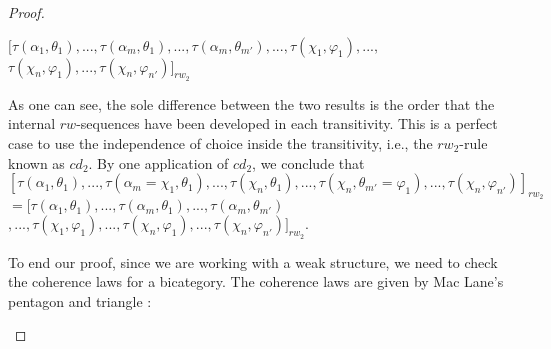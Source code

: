 \documentclass[12pt, a4paper,  oneside, headinclude,footinclude, BCOR5mm]{scrartcl}
\begin{document}
\begin{proof}
\begin{center}
$[\tau(\alpha_{1},\theta_{1}),...,\tau(\alpha_{m},\theta_{1}),...,\tau(\alpha_{m},\theta_{m'}),...,\tau(\chi_{1}, \varphi_{1}),...,$ $\tau(\chi_{n},\varphi_{1}),...,\tau(\chi_{n},\varphi_{n'})]_{rw_{2}}$

\end{center}

As one can see, the sole difference between the two results is the order that the internal $rw$-sequences have been developed in each transitivity. This is a perfect case to use the independence of choice inside the transitivity, i.e., the $rw_{2}$-rule known as $cd_{2}$. By one application of $cd_{2}$, we conclude that $[\tau(\alpha_{1}, \theta_{1}),..., \tau(\alpha_{m} = \chi_{1}, \theta_{1}), ..., \tau(\chi_{n},\theta_{1}), ..., \tau(\chi_{n},\theta_{m'} = \varphi_{1}),..., \tau(\chi_{n},\varphi_{n'})]_{rw_{2}}$ $= [\tau(\alpha_{1},\theta_{1}),...,\tau(\alpha_{m},\theta_{1}),...,\tau(\alpha_{m},\theta_{m'})$ $,...,\tau(\chi_{1}, \varphi_{1}),...,\tau(\chi_{n},\varphi_{1}),...,\tau(\chi_{n},\varphi_{n'})]_{rw_{2}}$.

To end our proof, since we are working with a weak structure, we need to check the coherence laws for a bicategory. The coherence laws are given by Mac Lane's pentagon and triangle \cite{Tom}:

\begin{center}

\bigskip


\end{center}
\end{proof}
\end{document}

